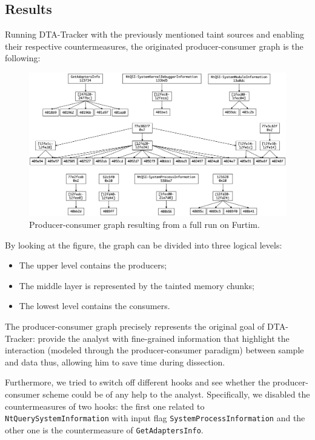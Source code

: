 \documentclass[LaM,binding=0.6cm]{sapthesis}
\begin{document}
\subsection{Results}
Running {\sf DTA-Tracker} with the previously mentioned taint sources and enabling their respective countermeasures, the originated producer-consumer graph is the following:\\

\begin{figure}[h!]
\centering%
\includegraphics[width=\textwidth]{images/eval1_def}
\caption{Producer-consumer graph resulting from a full run on Furtim.}
\label{fig:eval1}
\end{figure}

\noindent
By looking at the figure, the graph can be divided into three logical levels:
\begin{itemize}
\item The upper level contains the producers;
\item The middle layer is represented by the tainted memory chunks;
\item The lowest level contains the consumers.
\end{itemize}
The producer-consumer graph precisely represents the original goal of {\sf DTA-Tracker}: provide the analyst with fine-grained information that highlight the interaction (modeled through the producer-consumer paradigm) between sample and data thus, allowing him to save time during dissection.

Furthermore, we tried to switch off different hooks and see whether the producer-consumer scheme could be of any help to the analyst. Specifically, we disabled the countermeasures of two hooks: the first one related to \texttt{NtQuerySystemInformation} with input flag \texttt{SystemProcessInformation} and the other one is the countermeasure of \texttt{GetAdaptersInfo}.
\end{document}
